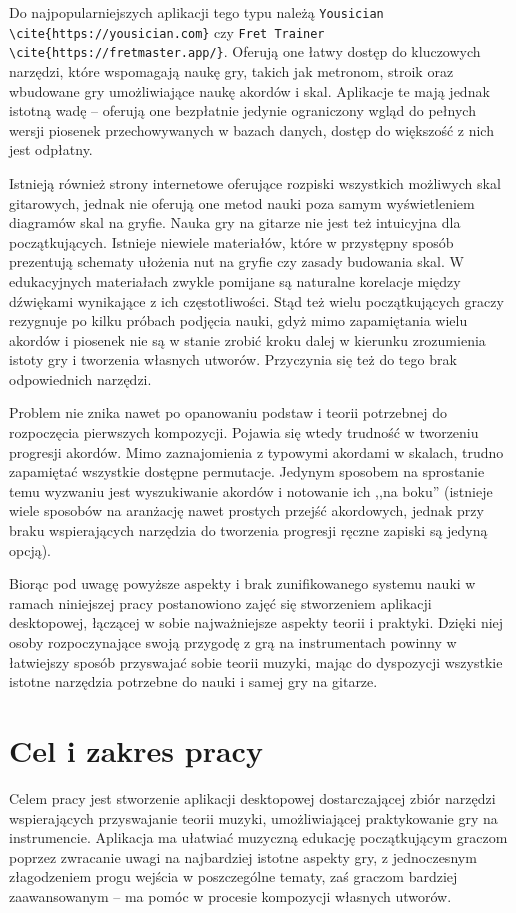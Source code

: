 Do najpopularniejszych aplikacji tego typu należą \texttt{Yousician} \verb+\cite{https://yousician.com}+ czy \texttt{Fret Trainer} \verb+\cite{https://fretmaster.app/}+. %
Oferują one łatwy dostęp do kluczowych narzędzi, które wspomagają naukę gry, takich jak metronom, stroik oraz wbudowane gry umożliwiające naukę akordów i skal. Aplikacje te mają jednak istotną wadę – oferują one bezpłatnie jedynie ograniczony wgląd do pełnych wersji piosenek przechowywanych w bazach danych, dostęp do większość z nich jest odpłatny.

Istnieją również strony internetowe oferujące rozpiski wszystkich możliwych skal gitarowych, jednak nie oferują one metod nauki poza samym wyświetleniem diagramów skal na gryfie. Nauka gry na gitarze nie jest też intuicyjna dla początkujących. Istnieje niewiele materiałów, które w przystępny sposób prezentują schematy ułożenia nut na gryfie czy zasady budowania skal. W edukacyjnych materiałach zwykle pomijane są naturalne korelacje między dźwiękami wynikające z ich częstotliwości. Stąd też wielu początkujących graczy rezygnuje po kilku próbach podjęcia nauki, gdyż mimo zapamiętania wielu akordów i piosenek nie są w stanie zrobić kroku dalej w kierunku zrozumienia istoty gry i tworzenia własnych utworów. Przyczynia się też do tego brak odpowiednich narzędzi.

Problem nie znika nawet po opanowaniu podstaw i teorii potrzebnej do rozpoczęcia pierwszych kompozycji. Pojawia się wtedy trudność w tworzeniu progresji akordów. Mimo zaznajomienia z typowymi akordami w skalach, trudno zapamiętać wszystkie dostępne permutacje. Jedynym sposobem na sprostanie temu wyzwaniu jest wyszukiwanie akordów i notowanie ich ,,na boku'' (istnieje wiele sposobów na aranżację nawet prostych przejść akordowych, jednak przy braku wspierających narzędzia do tworzenia progresji ręczne zapiski są jedyną opcją).

Biorąc pod uwagę powyższe aspekty i brak zunifikowanego systemu nauki w ramach niniejszej pracy postanowiono zajęć się stworzeniem aplikacji desktopowej, łączącej w sobie najważniejsze aspekty teorii i praktyki. Dzięki niej osoby rozpoczynające swoją przygodę z grą na instrumentach powinny w łatwiejszy sposób przyswajać sobie teorii muzyki, mając do dyspozycji wszystkie istotne narzędzia potrzebne do nauki i samej gry na gitarze.

\section{Cel i zakres pracy}
Celem pracy jest stworzenie aplikacji desktopowej dostarczającej zbiór narzędzi wspierających przyswajanie teorii muzyki, umożliwiającej praktykowanie gry na instrumencie. Aplikacja ma ułatwiać muzyczną edukację początkującym graczom poprzez zwracanie uwagi na najbardziej istotne aspekty gry, z jednoczesnym złagodzeniem progu wejścia w poszczególne tematy, zaś graczom bardziej zaawansowanym -- ma pomóc w procesie kompozycji własnych utworów. 

